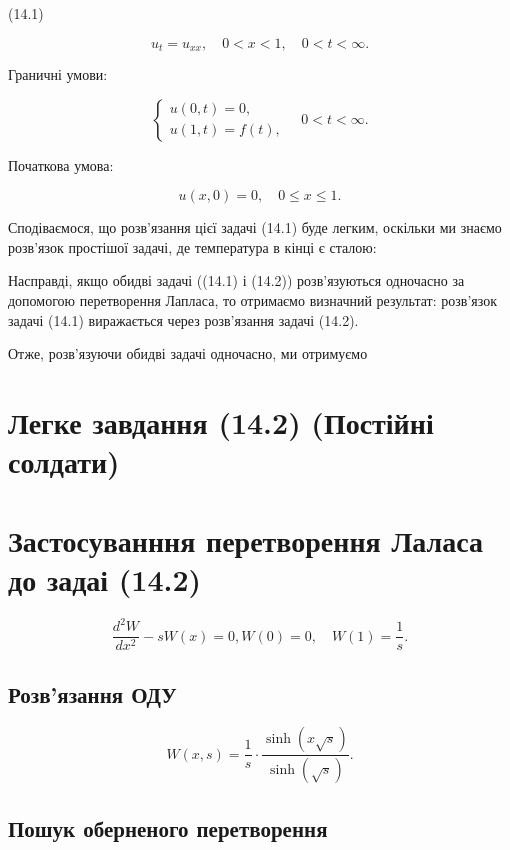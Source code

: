 \documentclass[
  ukrainian,
]{article}
\begin{document}
(14.1)

\[
u_t = u_{xx}, \quad 0 < x < 1, \quad 0 < t < \infty.
\]

Граничні умови:

\[
\begin{cases}
u(0, t) = 0, \\
u(1, t) = f(t),
\end{cases}
\quad 0 < t < \infty.
\]

Початкова умова:

\[
u(x, 0) = 0, \quad 0 \le x \le 1.
\]

Сподіваємося, що розв'язання цієї задачі (14.1) буде легким, оскільки ми
знаємо розв'язок простішої задачі, де температура в кінці є сталою:

Насправді, якщо обидві задачі ((14.1) і (14.2)) розв'язуються одночасно
за допомогою перетворення Лапласа, то отримаємо визначний результат:
розв'язок задачі (14.1) виражається через розв'язання задачі (14.2).

Отже, розв'язуючи обидві задачі одночасно, ми отримуємо

\section{Легке завдання (14.2) (Постійні
солдати)}\label{ux43bux435ux433ux43aux435-ux437ux430ux432ux434ux430ux43dux43dux44f-14.2-ux43fux43eux441ux442ux456ux439ux43dux456-ux441ux43eux43bux434ux430ux442ux438}

\section{Застосуванння перетворення Лаласа до задаі
(14.2)}\label{ux437ux430ux441ux442ux43eux441ux443ux432ux430ux43dux43dux43dux44f-ux43fux435ux440ux435ux442ux432ux43eux440ux435ux43dux43dux44f-ux43bux430ux43bux430ux441ux430-ux434ux43e-ux437ux430ux434ux430ux456-14.2}

\[
\frac{d^2 W}{dx^2} - s W(x) = 0,
W(0) = 0, \quad W(1) = \frac{1}{s}.
\]

\subsection{Розв'язання
ОДУ}\label{ux440ux43eux437ux432ux44fux437ux430ux43dux43dux44f-ux43eux434ux443}

\[
W(x, s) = \frac{1}{s} \cdot \frac{\sinh(x \sqrt{s})}{\sinh(\sqrt{s})}.
\]

\subsection{Пошук оберненого
перетворення}\label{ux43fux43eux448ux443ux43a-ux43eux431ux435ux440ux43dux435ux43dux43eux433ux43e-ux43fux435ux440ux435ux442ux432ux43eux440ux435ux43dux43dux44f}
\end{document}
